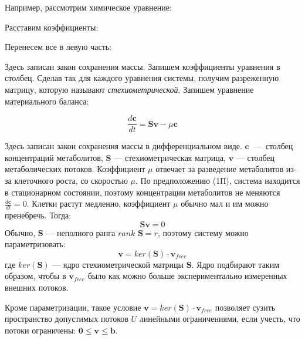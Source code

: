 \documentclass[14pt, a4paper]{extreport}
\begin{document}
Например, рассмотрим химическое уравнение:

\begin{center}
\end{center}

Расставим коэффициенты:

\begin{center}
\end{center}

Перенесем все в левую часть:

\begin{center}
\end{center}
Здесь записан закон сохранения массы. Запишем коэффициенты уравнения в столбец. Сделав так для каждого уравнения системы, получим разреженную матрицу, которую называют \emph{стехиометрической}.
Запишем уравнение материального баланса:

$$\frac{d\textbf{c}}{dt} = \textbf{Sv} - \mu{}\textbf{c}$$


Здесь записан закон сохранения массы в дифференциальном виде. $\textbf{c}$~---~столбец концентраций метаболитов, $\textbf{S}$ --- стехиометрическая матрица, $\textbf{v}$ --- столбец метаболических потоков. Коэффициент $\mu$ отвечает за разведение метаболитов из-за клеточного роста, со скоростью $\mu$. По предположению (1П), система находится в стационарном состоянии, поэтому концентрации метаболитов не меняются $\frac{d\textbf{c}}{dt} = 0$. Клетки растут медленно, коэффициент $\mu$ обычно мал и им можно пренебречь. Тогда:
$$ \textbf{Sv} = 0$$
Обычно, $\boldsymbol{S}$ --- неполного ранга $rank{ } \textbf{ S} = r$, поэтому систему можно параметризовать:
$$ \boldsymbol{v} = ker(\boldsymbol{S}) \cdot \boldsymbol{v}_{free}$$
где $ker(\textbf{S})$ --- ядро стехиометрической матрицы $\boldsymbol{S}$. Ядро подбирают таким образом, чтобы в $\boldsymbol{v}_{free}$ было как можно больше экспериментально измеренных внешних потоков.

Кроме параметризации, такое условие $\boldsymbol{v} = ker(\boldsymbol{S}) \cdot \boldsymbol{v}_{free}$ позволяет сузить пространство допустимых потоков $U$ линейными ограничениями, если учесть, что потоки ограничены: $\boldsymbol{0} \le \boldsymbol{v} \le \boldsymbol{b}$.



\clearpage
\end{document}
